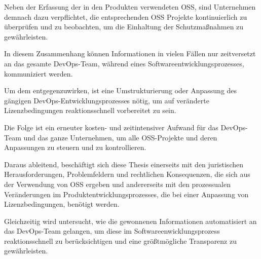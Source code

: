 Neben der Erfassung der in den Produkten verwendeten OSS, sind Unternehmen demnach dazu verpflichtet, die entsprechenden OSS Projekte kontinuierlich zu überprüfen und zu beobachten, um die Einhaltung der Schutzmaßnahmen zu gewährleisten.

In diesem Zusammenhang können Informationen in vielen Fällen nur zeitversetzt an das gesamte DevOps-Team, während eines Softwareentwicklungsprozesses, kommuniziert werden.

Um dem entgegenzuwirken, ist eine Umstrukturierung oder Anpassung des gängigen DevOps-Entwicklungsprozesses nötig, um auf veränderte Lizenzbedingungen reaktionsschnell vorbereitet zu sein.

Die Folge ist ein erneuter kosten- und zeitintensiver Aufwand für das DevOps-Team und das ganze Unternehmen, um alle OSS-Projekte und deren Anpassungen zu steuern und zu kontrollieren. 

Daraus ableitend, beschäftigt sich diese Thesis einerseits mit den juristischen Herausforderungen, Problemfeldern und rechtlichen Konsequenzen, die sich aus der Verwendung von OSS ergeben und andererseits mit den prozessualen Veränderungen im Produktentwicklungsprozesses, die bei einer Anpassung von Lizenzbedingungen, benötigt werden. 

Gleichzeitig wird untersucht, wie die gewonnenen Informationen automatisiert an das DevOps-Team gelangen, um diese im Softwareenwicklungsprozess reaktionsschnell zu berücksichtigen und eine größtmögliche Transparenz zu gewährleisten.  


